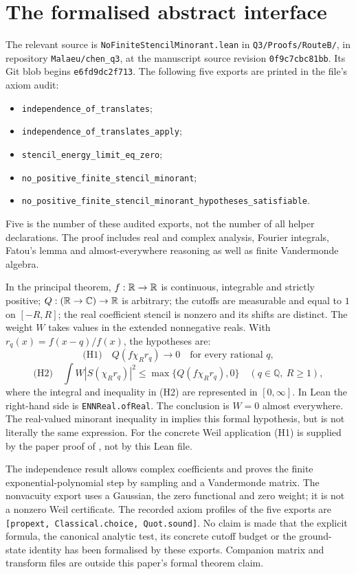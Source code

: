 \section{The formalised abstract interface}\label{app:lean}

The relevant source is \texttt{NoFiniteStencilMinorant.lean} in
\texttt{Q3/Proofs/RouteB/}, in repository \texttt{Malaeu/chen\_q3},
at the manuscript source revision \texttt{0f9c7cbc81bb}.
Its Git blob begins \texttt{e6fd9dc2f713}.
The following five exports are printed in the file's axiom audit:
\begin{itemize}[leftmargin=2em]
\item \texttt{independence\_of\_translates};
\item \texttt{independence\_of\_translates\_apply};
\item \texttt{stencil\_energy\_limit\_eq\_zero};
\item \texttt{no\_positive\_finite\_stencil\_minorant};
\item \texttt{no\_positive\_finite\_stencil\_minorant\_hypotheses\_satisfiable}.
\end{itemize}
Five is the number of these audited exports, not the number of all
helper declarations. The proof includes real and complex analysis,
Fourier integrals, Fatou's lemma and almost-everywhere reasoning as
well as finite Vandermonde algebra.

In the principal theorem, $f:\mathbb R\to\mathbb R$ is continuous, integrable and
strictly positive; $Q:(\mathbb R\to\mathbb C)\to\mathbb R$ is arbitrary; the cutoffs are
measurable and equal to $1$ on $[-R,R]$; the real coefficient stencil
is nonzero and its shifts are distinct. The weight $W$ takes values
in the extended nonnegative reals. With
$r_q(x)=f(x-q)/f(x)$, the hypotheses are:
\[
 \text{(H1)}\quad Q(f\chi_Rr_q)\longrightarrow0
       \quad\text{for every rational }q,
\]
\[
 \text{(H2)}\quad
 \int W|S(\chi_Rr_q)|^2
       \le\max\{Q(f\chi_Rr_q),0\}
       \quad(q\in\mathbb Q,\ R\ge1),
\]
where the integral and inequality in (H2) are represented in
$[0,\infty]$. In Lean the right-hand side is
\texttt{ENNReal.ofReal}. The conclusion is $W=0$ almost everywhere.
The real-valued minorant inequality in  implies
this formal hypothesis, but is not literally the same expression.
For the concrete Weil application (H1) is supplied by the paper
proof of , not by this Lean file.

The independence result allows complex coefficients and proves the
finite exponential-polynomial step by sampling and a Vandermonde
matrix. The nonvacuity export uses a Gaussian, the zero functional
and zero weight; it is not a nonzero Weil certificate. The recorded
axiom profiles of the five exports are
\texttt{[propext, Classical.choice, Quot.sound]}.
No claim is made that the explicit formula, the canonical analytic
test, its concrete cutoff budget or the ground-state identity has
been formalised by these exports. Companion matrix and transform
files are outside this paper's formal theorem claim.
